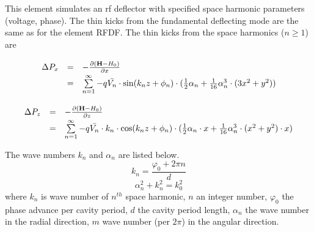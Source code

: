 This element simulates an rf deflector with specified space harmonic parameters (voltage, phase).
The thin kicks from the fundamental deflecting mode are the same as for the element RFDF. The thin kicks from the space
harmonics ($n\ge 1$) are \cite{Sun-NAPAC19}

\begin{equation}
\renewcommand{\arraystretch}{1.5}
\begin{array}{lcl}
\Delta P_x & = & -\frac{\partial ({\bf H} - H_0)}{\partial x} \\
  &  = & \sum\limits_{n=1}^{\infty} -q \bar{ V_n} \cdot \sin (k_n z + \phi_n) \cdot (\frac{1}{2}\alpha_n + \frac{1}{16}\alpha_n^3 \cdot (3x^2 + y^2)) \\
\end{array}
\end{equation}

\begin{equation}
\renewcommand{\arraystretch}{1.5}
\begin{array}{lcl}
\Delta P_z & = & -\frac{\partial ({\bf H} - H_0)}{\partial z} \\
           & = & \sum\limits_{n=1}^{\infty} -q \bar{ V_n} \cdot k_n \cdot \cos (k_n z + \phi_n) 
           \cdot (\frac{1}{2}\alpha_n \cdot x + \frac{1}{16}\alpha_n^3 \cdot (x^2 + y^2)\cdot x)\\
\end{array}
\end{equation} 

The wave numbers $k_n$ and $\alpha_n$ are listed below.
\begin{equation}\label{Equa1}
k_n = \frac{\varphi_0 + 2\pi n}{d}
\end{equation} 
\begin{equation}\label{Equa1}
\alpha_n^2 + k_n^2 = k_0^2
\end{equation} 
where $k_n$ is wave number of $n^{th}$ space harmonic, $n$ an integer number, $\varphi_0$ the phase advance per cavity
period, $d$ the cavity period length, $\alpha_n$ the wave number in the radial direction, $m$ wave number (per $2\pi$)
in the angular direction.


